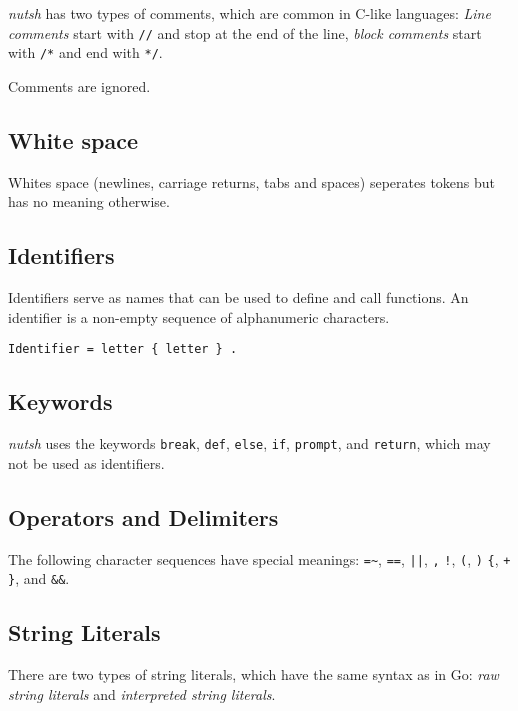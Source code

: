 \documentclass[twoside,parskip]{scrreprt}
\begin{document}
\emph{nutsh} has two types of comments, which are common in C-like languages: \emph{Line comments} start with \texttt{//} and stop at the end of the line, \emph{block comments} start with \texttt{/*} and end with \texttt{*/}.

Comments are ignored.

\subsection{White space}

Whites space (newlines, carriage returns, tabs and spaces) seperates tokens but has no meaning otherwise.

\subsection{Identifiers}

Identifiers serve as names that can be used to define and call functions. An identifier is a non-empty sequence of alphanumeric characters.

\begin{lstlisting}
Identifier = letter { letter } .
\end{lstlisting}

\subsection{Keywords}

\emph{nutsh} uses the keywords \texttt{break}, \texttt{def}, \texttt{else}, \texttt{if}, \texttt{prompt}, and \texttt{return}, which may not be used as identifiers.

\subsection{Operators and Delimiters}

The following character sequences have special meanings: \texttt{=\~},
\texttt{==},
\texttt{||},
\texttt{,}
\texttt{!},
\texttt{(},
\texttt{)}
\texttt{\{},
\texttt{+}
\texttt{\}}, and
\texttt{\&\&}.

\subsection{String Literals}

There are two types of string literals, which have the same syntax as in Go: \emph{raw string literals} and \emph{interpreted string literals}.
\end{document}
